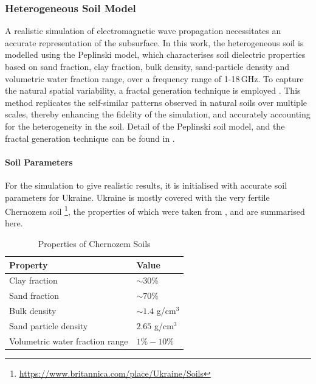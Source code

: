         
    
    \subsubsection{Heterogeneous Soil Model}
    
        A realistic simulation of electromagnetic wave propagation necessitates an accurate representation of the subsurface. In this work, the heterogeneous soil is modelled using the Peplinski model, which characterises soil dielectric properties based on sand fraction, clay fraction, bulk density, sand-particle density and volumetric water fraction range, over a frequency range of 1-18\,GHz. To capture the natural spatial variability, a fractal generation technique is employed \cite{dummyRef5}. This method replicates the self-similar patterns observed in natural soils over multiple scales, thereby enhancing the fidelity of the simulation, and accurately accounting for the heterogeneity in the soil. Detail of the Peplinski soil model, and the fractal generation technique can be found in \cite{warren2016gprmax}. 

        \paragraph{Soil Parameters}

            For the simulation to give realistic results, it is initialised with accurate soil parameters for Ukraine. Ukraine is mostly covered with the very fertile Chernozem soil \footnote{\url{https://www.britannica.com/place/Ukraine/Soils}}, the properties of which were taken from \cite{suleymanov2021chernozem}, and are summarised here.

            \begin{table}[htbp]
              \centering
              \caption{Properties of Chernozem Soils}
              \begin{tabular}{@{} l l @{}} 
                \toprule
                \textbf{Property} & \textbf{Value} \\
                \midrule
                Clay fraction & $\sim 30\%$ \\
                Sand fraction & $\sim 70\%$ \\
                Bulk density & $\sim 1.4$ g/cm$^3$ \\
                Sand particle density & $2.65$ g/cm$^3$ \\
                Volumetric water fraction range & $1\% - 10\%$ \\
                \bottomrule
              \end{tabular}
            \end{table}
    
